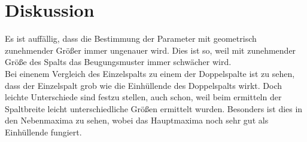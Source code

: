 \section{Diskussion}
\label{sec:Diskussion}

Es ist auffällig, dass die Bestimmung der Parameter mit geometrisch zunehmender Größer immer ungenauer wird.
Dies ist so, weil mit zunehmender Größe des Spalts das Beugungsmuster immer schwächer wird. \\

Bei einenem Vergleich des Einzelspalts zu einem der Doppelspalte ist zu sehen, dass der Einzelspalt grob wie die Einhüllende des Doppelspalts wirkt.
Doch leichte Unterschiede sind festzu stellen, auch schon, weil beim ermitteln der Spaltbreite leicht unterschiedliche Größen ermittelt wurden.
Besonders ist dies in den Nebenmaxima zu sehen, wobei das Hauptmaxima noch sehr gut als Einhüllende fungiert.